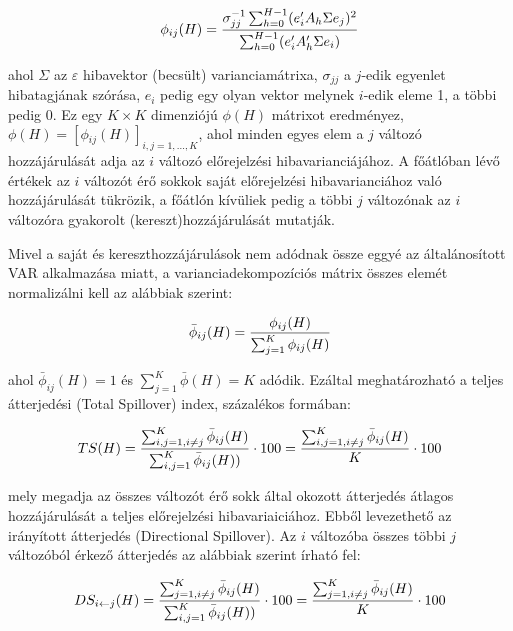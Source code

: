 \documentclass[12pt,bibliography=totoc]{article}
\begin{document}
\begin{equation}
\phi_{ij}(H)=\frac{\sigma_{jj}^{-1}\sum_{h=0}^{H-1}(e'_{i}A_{h}\Sigma{}e_{j})^{2}} {\sum_{h=0}^{H-1}(e'_{i}A'_{h}\Sigma{}e_{i})} \\
\end{equation}

ahol $\Sigma$ az $\varepsilon$ hibavektor (becsült) varianciamátrixa, $\sigma_{jj}$ a $j$-edik egyenlet hibatagjának szórása, $e_{i}$ pedig egy olyan vektor melynek $i$-edik eleme 1, a többi pedig 0. Ez egy $K\times K$ dimenziójú $\phi{}(H)$ mátrixot eredményez, $\phi{}(H) = [\phi{}_{ij}(H)]_{i,j=1,...,K}$, ahol minden egyes elem a $j$ változó hozzájárulását adja az $i$ változó előrejelzési hibavarianciájához. A főátlóban lévő értékek az $i$ változót érő sokkok saját előrejelzési hibavarianciához való hozzájárulását tükrözik, a főátlón kívüliek pedig a többi $j$ változónak az $i$ változóra gyakorolt (kereszt)hozzájárulását mutatják.

Mivel a saját és kereszthozzájárulások nem adódnak össze eggyé az általánosított VAR alkalmazása miatt, a varianciadekompozíciós mátrix összes elemét normalizálni kell az alábbiak szerint:

\begin{equation}
\bar{\phi}_{ij}(H)=\frac{\phi_{ij}(H)} {\sum_{j=1}^{K}\phi_{ij}(H)} \\
\end{equation}

ahol $\bar{\phi}_{ij}(H)=1$ és $\sum_{j=1}^{K}\bar{\phi}(H)=K$ adódik. Ezáltal meghatározható a teljes átterjedési (Total Spillover) index, százalékos formában:


\begin{equation}
TS(H)=\frac{\sum_{i,j=1,i\neq{}j}^{K}\bar{\phi}_{ij}(H)} {\sum_{i,j=1}^{K}\bar{\phi}_{ij}(H))} \cdot 100= \frac{\sum_{i,j=1,i\neq{}j}^{K}\bar{\phi}_{ij}(H)} {K} \cdot 100 \\
\end{equation}

mely megadja az összes változót érő sokk által okozott átterjedés átlagos hozzájárulását a teljes előrejelzési hibavariaiciához. Ebből levezethető az irányított átterjedés (Directional Spillover). Az $i$ változóba összes többi $j$ változóból érkező átterjedés az alábbiak szerint írható fel: 

\begin{equation}
DS_{i\leftarrow{}j}(H)=\frac{\sum_{j=1,i\neq{}j}^{K}\bar{\phi}_{ij}(H)} {\sum_{i,j=1}^{K}\bar{\phi}_{ij}(H))} \cdot 100= \frac{\sum_{j=1,i\neq{}j}^{K}\bar{\phi}_{ij}(H)} {K} \cdot 100 \\
\end{equation}
\end{document}
